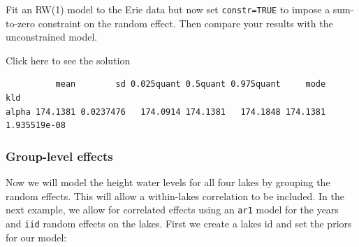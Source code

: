 \documentclass[
  letterpaper,
  DIV=11,
  numbers=noendperiod]{scrartcl}
\newenvironment{Shaded}{\begin{snugshade}}{\end{snugshade}}
\newcommand{\AttributeTok}[1]{\textcolor[rgb]{0.40,0.45,0.13}{#1}}
\newcommand{\CommentTok}[1]{\textcolor[rgb]{0.37,0.37,0.37}{#1}}
\newcommand{\ConstantTok}[1]{\textcolor[rgb]{0.56,0.35,0.01}{#1}}
\newcommand{\DecValTok}[1]{\textcolor[rgb]{0.68,0.00,0.00}{#1}}
\newcommand{\ErrorTok}[1]{\textcolor[rgb]{0.68,0.00,0.00}{#1}}
\newcommand{\FunctionTok}[1]{\textcolor[rgb]{0.28,0.35,0.67}{#1}}
\newcommand{\NormalTok}[1]{\textcolor[rgb]{0.00,0.23,0.31}{#1}}
\newcommand{\OtherTok}[1]{\textcolor[rgb]{0.00,0.23,0.31}{#1}}
\newcommand{\SpecialCharTok}[1]{\textcolor[rgb]{0.37,0.37,0.37}{#1}}
\newcommand{\StringTok}[1]{\textcolor[rgb]{0.13,0.47,0.30}{#1}}
\begin{document}
\begin{tcolorbox}[enhanced jigsaw, opacityback=0, colframe=quarto-callout-warning-color-frame, colbacktitle=quarto-callout-warning-color!10!white, titlerule=0mm, left=2mm, breakable, rightrule=.15mm, opacitybacktitle=0.6, coltitle=black, bottomrule=.15mm, arc=.35mm, leftrule=.75mm, title={Task}, bottomtitle=1mm, toptitle=1mm, toprule=.15mm, colback=white]

Fit an RW(1) model to the Erie data but now set \texttt{constr=TRUE} to
impose a sum-to-zero constraint on the random effect. Then compare your
results with the unconstrained model.

Click here to see the solution

\begin{Shaded}
\end{Shaded}

\begin{verbatim}
          mean        sd 0.025quant 0.5quant 0.975quant     mode          kld
alpha 174.1381 0.0237476   174.0914 174.1381   174.1848 174.1381 1.935519e-08
\end{verbatim}

\end{tcolorbox}

\subsubsection{Group-level effects}\label{group-level-effects}

Now we will model the height water levels for all four lakes by grouping
the random effects. This will allow a within-lakes correlation to be
included. In the next example, we allow for correlated effects using an
\texttt{ar1} model for the years and \texttt{iid} random effects on the
lakes. First we create a lakes id and set the priors for our model:
\end{document}
